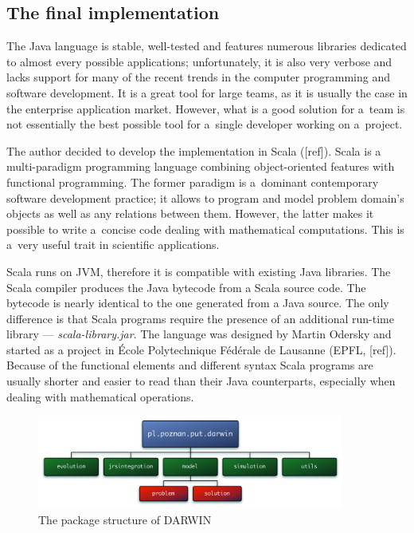 \subsection{The final implementation}
The Java language is stable, well-tested and features numerous libraries
dedicated to almost every possible applications; unfortunately, it is also
very verbose and lacks support for many of the recent trends in the computer
programming and software development. It is a great tool for large teams, as
it is usually the case in the enterprise application market. However, what is
a good solution for a~team is not essentially the best possible tool for
a~single developer working on a~project.

The author decided to develop the implementation in Scala ([ref]). Scala is a
multi-paradigm programming language combining object-oriented features with
functional programming. The former paradigm is a~dominant contemporary
software development practice; it allows to program and model problem domain's
objects as well as any relations between them. However, the latter makes it
possible to write a~concise code dealing with mathematical computations. This
is a~very useful trait in scientific applications.

Scala runs on JVM, therefore it is compatible with existing Java
libraries. The Scala compiler produces the Java bytecode from a Scala source
code. The bytecode is nearly identical to the one generated from a Java
source. The only difference is that Scala programs require the presence of an
additional run-time library --- \textit{scala-library.jar}. The language was
designed by Martin Odersky and started as a project in École Polytechnique
Fédérale de Lausanne (EPFL, [ref]). Because of the functional elements and
different syntax Scala programs are usually shorter and easier to read than
their Java counterparts, especially when dealing with mathematical operations.

\begin{figure}
  \centering \includegraphics[width=0.9\textwidth]{img/packages}
  \caption{The package structure of DARWIN}
  \label{packages}
\end{figure}

